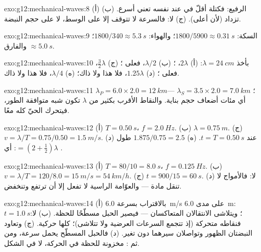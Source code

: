 \begin{solution}{exo:g12:mechanical-waves:8}
(أ) الرفيع: فكتلة أقلّ في  عند  نفسه تعني 
أسرع. (ب) تزداد (لأن  أعلى). (ج) لا: فالسرعة لا تتوقف
إلا على الوسط، لا على حجم النبضة.
\end{solution}

\begin{solution}{exo:g12:mechanical-waves:9}
السكة: $1800/5900 \approx \qty{0.31}{s}$؛ والهواء:
$1800/340 \approx \qty{5.3}{s}$؛ والفارق $\approx \qty{5.0}{s}$.
\end{solution}

\begin{solution}{exo:g12:mechanical-waves:10}
بأخذ $\lambda = \qty{24}{cm}$: (أ) $2\lambda$، ؛
(ب) $\lambda/2$، فعلى ؛ (ج) $\tfrac32\lambda$، فعلى ؛
(د) $1.25\lambda$، فلا هذا ولا ذاك؛ (ه) $\lambda/4$، فلا هذا ولا ذاك.
\end{solution}

\begin{solution}{exo:g12:mechanical-waves:11}
$\lambda_P = 6.0 \times 2.0 = \qty{12}{km}$؛
$\lambda_S = 3.5 \times 2.0 = \qty{7.0}{km}$ --- أي مئات أضعاف
حجم بناية. والنقاط الأقرب بكثير من $\lambda$ تكون شبه متوافقة
الطور، فيتحرك الحيّ كله معًا.
\end{solution}

\begin{solution}{exo:g12:mechanical-waves:12}
(أ) $T = \qty{0.50}{s}$، $f = \qty{2.0}{Hz}$.
(ب) $\lambda = \qty{0.75}{m}$.
(ج) $v = \lambda/T = 0.75/0.50 = \qty{1.5}{m/s}$.
(د) عند $t = T = \qty{0.50}{s}$. (ه) $1.875/0.75 = 2.5$ طول 
$= (2 + \tfrac12)\lambda$: أي .
\end{solution}

\begin{solution}{exo:g12:mechanical-waves:13}
(أ) $T = 80/10 = \qty{8.0}{s}$، $f = \qty{0.125}{Hz}$.
(ب) $v = \lambda/T = 120/8.0 = \qty{15}{m/s} = \qty{54}{km/h}$.
(ج) $t = 900/15 = \qty{60}{s}$. (د) لا: فالأمواج لا تنقل مادة ---
والعوّامة الراسية لا تفعل إلا أن ترتفع وتنخفض.
\end{solution}

\begin{solution}{exo:g12:mechanical-waves:14}
(أ) بالاقتراب بسرعة \qty{6.0}{m/s} على مدى \qty{6.0}{m}: $t = \qty{1.0}{s}$؛
ويتلاشى الانتقالان المتعاكسان --- فيصير الحبل مسطّحًا للحظة.
(ب) لا: فنقاطه متحركة (إذ تتجمع السرعات العرضية ولا
تتلاشى)؛  كلها حركية. (ج) وتعاود النبضتان الظهور
وتواصلان سيرهما دون تغير. (د) فالحبل المسطّح يحمل سرعة، ومن ثم :
 مخزونة للحظة في الحركة، لا في الشكل.
\end{solution}


